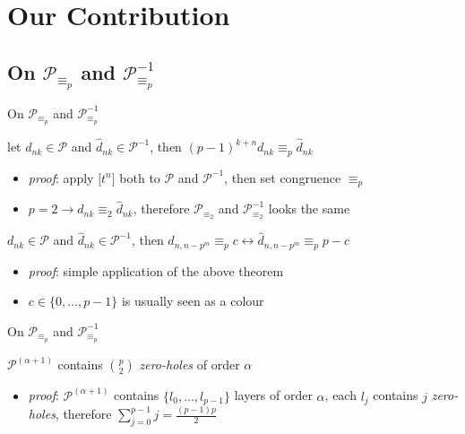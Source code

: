 \documentclass[10pt,serif, professionalfont]{beamer}
\begin{document}
\section{Our Contribution}

\subsection{On $\mathcal{P}_{\equiv_{p}}$ and $\mathcal{P}_{\equiv_{p}}^{-1}$}

\begin{frame}{On $\mathcal{P}_{\equiv_{p}}$ and $\mathcal{P}_{\equiv_{p}}^{-1}$}
    \begin{theorem}
        let $d_{nk}\in\mathcal{P}$ and  $\hat{d}_{nk}\in\mathcal{P}^{-1}$, then
            $(p-1)^{k+n}d_{nk}\equiv_{p} \hat{d}_{nk}$
    \end{theorem}
    \begin{itemize}
        \item \emph{proof}: apply $\big[t^{n}\big]$ both to $\mathcal{P}$ and $\mathcal{P}^{-1}$,
            then set congruence $\equiv_{p}$ 
        \item $p=2 \rightarrow d_{nk}\equiv_{2}\hat{d}_{nk}$, therefore $\mathcal{P}_{\equiv_{2}}$ and 
            $\mathcal{P}_{\equiv_{2}}^{-1}$ looks the same
    \end{itemize}
    \pause
    \begin{theorem}
        $d_{nk}\in\mathcal{P}$ and $\hat{d}_{nk}\in\mathcal{P}^{-1}$, then
            \indent $d_{n,n-p^{m}} \equiv_{p} c \leftrightarrow \hat{d}_{n,n-p^{m}} \equiv_{p} p-c$
    \end{theorem}
    \begin{itemize}
        \item \emph{proof}: simple application of the above theorem
        \item $c\in\lbrace0,\ldots,p-1\rbrace$ is usually seen as a colour
    \end{itemize}
\end{frame}

\begin{frame}{On $\mathcal{P}_{\equiv_{p}}$ and $\mathcal{P}_{\equiv_{p}}^{-1}$}
    \begin{theorem}
         $\mathcal{P}^{(\alpha+1)}$ contains 
        ${{p}\choose{2}}$ \emph{zero-holes} of order $\alpha$
    \end{theorem}
    \begin{itemize}
        \item \emph{proof}: $\mathcal{P}^{(\alpha+1)}$ contains $\lbrace l_{0},\ldots,l_{p-1}\rbrace$ 
            layers of order $\alpha$, each $l_{j}$ contains $j$ \emph{zero-holes}, therefore
            $\sum_{j=0}^{p-1}{j}=\frac{(p-1)p}{2}$
    \end{itemize}
    
    
\end{frame}
\end{document}
